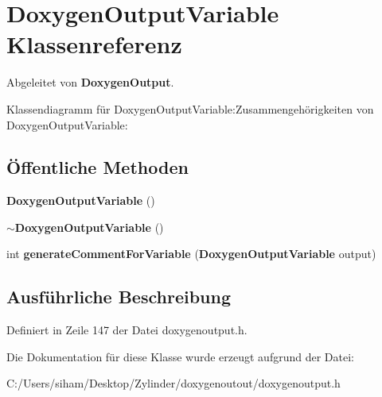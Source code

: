 \section{Doxygen\-Output\-Variable Klassenreferenz}
\label{class_doxygen_output_variable}
Abgeleitet von {\bf Doxygen\-Output}.

Klassendiagramm f\"{u}r Doxygen\-Output\-Variable:Zusammengeh\"{o}rigkeiten von Doxygen\-Output\-Variable:\subsection*{\"{O}ffentliche Methoden}
\begin{CompactItemize}
\item 
{\bf Doxygen\-Output\-Variable} ()\label{class_doxygen_output_variable_52a59495cba30a0b91298ce9d56a5c15}

\item 
{\bf $\sim$Doxygen\-Output\-Variable} ()\label{class_doxygen_output_variable_44302f11dc77fb9578932ee663e8128a}

\item 
int {\bf generate\-Comment\-For\-Variable} ({\bf Doxygen\-Output\-Variable} output)\label{class_doxygen_output_variable_c73114a8b50a70931e7151241216a682}

\end{CompactItemize}


\subsection{Ausf\"{u}hrliche Beschreibung}




Definiert in Zeile 147 der Datei doxygenoutput.h.

Die Dokumentation f\"{u}r diese Klasse wurde erzeugt aufgrund der Datei:\begin{CompactItemize}
\item 
C:/Users/siham/Desktop/Zylinder/doxygenoutout/doxygenoutput.h\end{CompactItemize}
